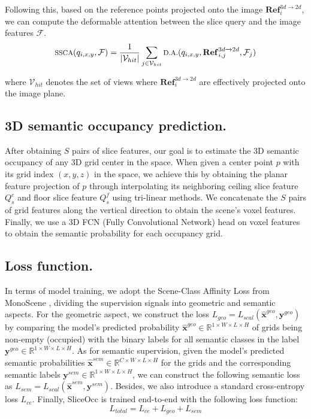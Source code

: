 \documentclass[letterpaper, 10 pt, conference]{ieeeconf}  %
\begin{document}
Following this, based on the reference points projected onto the image $\mathbf{Ref}_i^{3d \xrightarrow{}2d}$, we can compute the deformable attention between the slice query and the image features $\mathcal{F}$.
\vspace{-3pt}
\begin{equation}
    \footnotesize
    \text{SSCA}(q_{i,x,y},\mathcal{F}) = \frac{1}{|\mathcal{V}_{hit}|}\sum_{j \in \mathcal{V}_{hit}} \text{D.A.}(q_{i,x,y}, \mathbf{Ref}_{i,j}^{3d \xrightarrow{}2d}, \mathcal{F}_j)
\end{equation}

\noindent where $\mathcal{V}_{hit}$ denotes the set of views where $\mathbf{Ref}_i^{3d \xrightarrow{}2d}$ are effectively projected onto the image plane.

\subsection{3D semantic occupancy prediction.}
After obtaining $S$ pairs of slice features, our goal is to estimate the 3D semantic occupancy of any 3D grid center in the space. When given a center point $p$ with its grid index $(x, y, z)$ in the space, we achieve this by obtaining the planar feature projection of $p$ through interpolating its neighboring ceiling slice feature $Q_s^c$ and floor slice feature $Q_s^f$ using tri-linear methods. We concatenate the $S$ pairs of grid features along the vertical direction to obtain the scene's voxel features. Finally, we use a 3D FCN (Fully Convolutional Network) head on voxel features to obtain the semantic probability for each occupancy grid. 
\subsection{Loss function.}
In terms of model training, we adopt the Scene-Class Affinity Loss from MonoScene \cite{cao2022monoscene}, dividing the supervision signals into geometric and semantic aspects. For the geometric aspect, we construct the loss $L_{geo} = L_{scal}(\hat{\mathbf{x}}^{geo}, \mathbf{y}^{geo})$ by comparing the model's predicted probability $\hat{\mathbf{x}}^{geo} \in \mathbb{R}^{1\times W \times L \times H}$ of grids being non-empty (occupied) with the binary labels for all semantic classes in the label $\mathbf{y}^{geo} \in \mathbb{R}^{1\times W \times L \times H}$. As for semantic supervision, given the model's predicted semantic probabilities $\hat{\mathbf{x}}^{sem} \in \mathbb{R}^{C \times W \times L \times H}$ for the grids and the corresponding semantic labels $\mathbf{y}^{sem} \in \mathbb{R}^{1\times W \times L \times H}$, we can construct the following semantic loss as $L_{sem} = L_{scal}(\hat{\mathbf{x}}^{sem}, \mathbf{y}^{sem})$. Besides, we also introduce a standard cross-entropy loss $L_{ce}$. Finally, SliceOcc is trained end-to-end with the following loss function:
\vspace{-5pt}
\begin{equation}
    L_{total} = L_{ce} + L_{geo} + L_{sem}
\end{equation}
\end{document}
